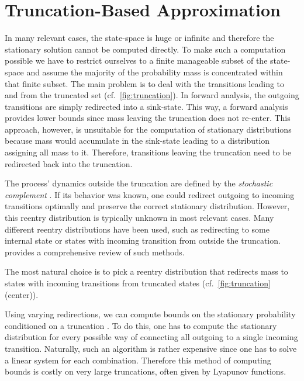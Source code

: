 \section{Truncation-Based Approximation}\label{sec:statagg:fsp}
In many relevant cases, the state-space is huge or infinite and therefore the stationary solution cannot be computed directly.
To make such a computation possible we have to restrict ourselves to a finite manageable subset of the state-space and assume the majority of the probability mass is concentrated within that finite subset.
The main problem is to deal with the transitions leading to and from the truncated set (cf.\ \autoref{fig:truncation}).
In forward analysis, the outgoing transitions are simply redirected into a sink-state.
This way, a forward analysis provides lower bounds since mass leaving the truncation does not re-enter.
This approach, however, is unsuitable for the computation of stationary distributions because mass would accumulate in the sink-state leading to a distribution assigning all mass to it.
Therefore, transitions leaving the truncation need to be redirected back into the truncation.

The process' dynamics outside the truncation are defined by the \emph{stochastic complement} \parencite{spieler2014numerical}.
If its behavior was known, one could redirect outgoing to incoming transitions optimally and preserve the correct stationary distribution.
However, this reentry distribution is typically unknown in most relevant cases.
Many different reentry distributions have been used, such as redirecting to some internal state or states with incoming transition from outside the truncation.
\citet{kuntz2021approximations} provides a comprehensive review of such methods.

The most natural choice is to pick a reentry distribution that redirects mass to states with incoming transitions from truncated states (cf.\ \autoref{fig:truncation} (center)).

Using varying redirections, we can compute bounds on the stationary probability conditioned on a truncation \parencite[Thm.~14]{spieler2014numerical}.
To do this, one has to compute the stationary distribution for every possible way of connecting all outgoing to a single incoming transition.
Naturally, such an algorithm is rather expensive since one has to solve a linear system for each combination.
Therefore this method of computing bounds is costly on very large truncations, often given by Lyapunov functions.

